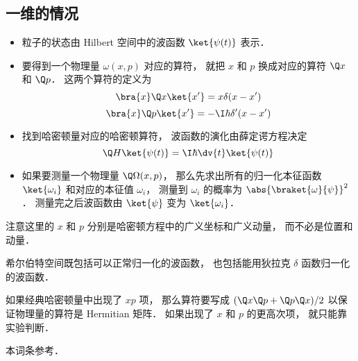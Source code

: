 


\subsection{一维的情况}
\begin{itemize}
\item 粒子的状态由 Hilbert 空间中的波函数 $\ket{\psi(t)}$ 表示．
\item 要得到一个物理量 $\omega(x, p)$ 对应的算符， 就把 $x$ 和 $p$ 换成对应的算符 $\Q x$ 和 $\Q p$． 这两个算符的定义为
\begin{equation}
\bra{x}\Q x \ket{x'} = x\delta(x-x')
\end{equation}
\begin{equation}
\bra{x}\Q p \ket{x'} = -\I\hbar \delta'(x-x')
\end{equation}
\item 找到哈密顿量对应的哈密顿算符， 波函数的演化由薛定谔方程决定
\begin{equation}
\Q H \ket{\psi(t)} = \I \hbar \dv{t} \ket{\psi(t)}
\end{equation}
\item 如果要测量一个物理量 $\Q\Omega(x, p)$， 那么先求出所有的归一化本征函数 $\ket{\omega_i}$ 和对应的本征值 $\omega_i$， 测量到 $\omega_i$ 的概率为 $\abs{\braket{\omega}{\psi}}^2$． 测量完之后波函数由 $\ket{\psi}$ 变为 $\ket{\omega_i}$．
\end{itemize}

注意这里的 $x$ 和 $p$ 分别是哈密顿方程中的广义坐标和广义动量， 而不必是位置和动量．

希尔伯特空间既包括可以正常归一化的波函数， 也包括能用狄拉克 $\delta$ 函数归一化的波函数．

如果经典哈密顿量中出现了 $xp$ 项， 那么算符要写成 $(\Q x \Q p + \Q p \Q x)/2$ 以保证物理量的算符是 Hermitian 矩阵． 如果出现了 $x$ 和 $p$ 的更高次项， 就只能靠实验判断．

本词条参考\cite{Shankar}．

